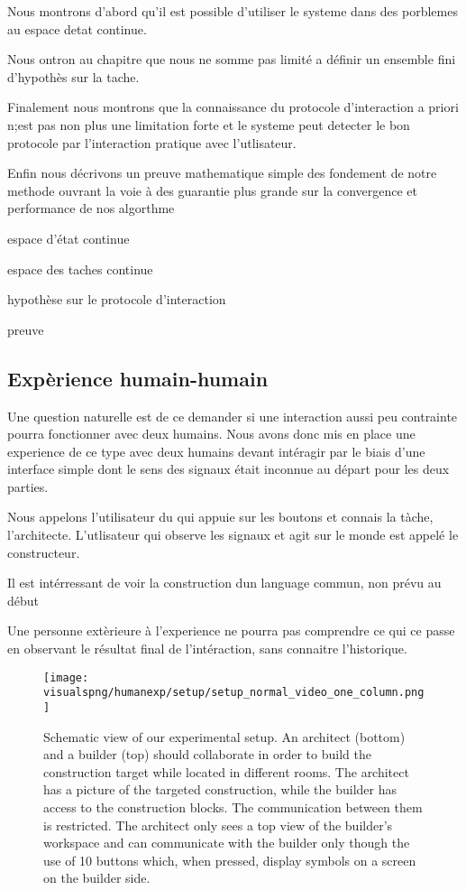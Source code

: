Nous montrons d'abord qu'il est possible d'utiliser le systeme dans des porblemes au espace detat continue. 

Nous ontron au chapitre que nous ne somme pas limité a définir un ensemble fini d'hypothès sur la tache.

Finalement nous montrons que la connaissance du protocole d'interaction a priori n;est pas non plus une limitation forte et le systeme peut detecter le bon protocole par l'interaction pratique avec l'utlisateur.

Enfin nous décrivons un preuve mathematique simple des fondement de notre methode ouvrant la voie à des guarantie plus grande sur la convergence et performance de nos algorthme


espace d'état continue

espace des taches continue

hypothèse sur le protocole d'interaction

preuve

\subsection*{Expèrience humain-humain}

Une question naturelle est de ce demander si une interaction aussi peu contrainte pourra fonctionner avec deux humains. Nous avons donc mis en place une experience de ce type avec deux humains devant intéragir par le biais d'une interface simple dont le sens des signaux était inconnue au départ pour les deux parties. 

Nous appelons l'utilisateur du qui appuie sur les boutons et connais la tàche, l'architecte. L'utlisateur qui observe les signaux et agit sur le monde est appelé le constructeur.

Il est intérressant de voir la construction dun language commun, non prévu au début

Une personne extèrieure à l'experience ne pourra pas comprendre ce qui ce passe en observant le résultat final de l'intéraction, sans connaitre l'historique.

\begin{figure}[!htbp]
\centering
\texttt{[image: \\visualspng/humanexp/setup/setup\_normal\_video\_one\_column.png]}
\caption{Schematic view of our experimental setup. An architect (bottom) and a builder (top) should collaborate in order to build the construction target while located in different rooms. The architect has a picture of the targeted construction, while the builder has access to the construction blocks. The communication between them is restricted. The architect only sees a top view of the builder's workspace and can communicate with the builder only though the use of 10 buttons which, when pressed, display symbols on a screen on the builder side.}
\label{fig:overviewsetup}
\end{figure}

